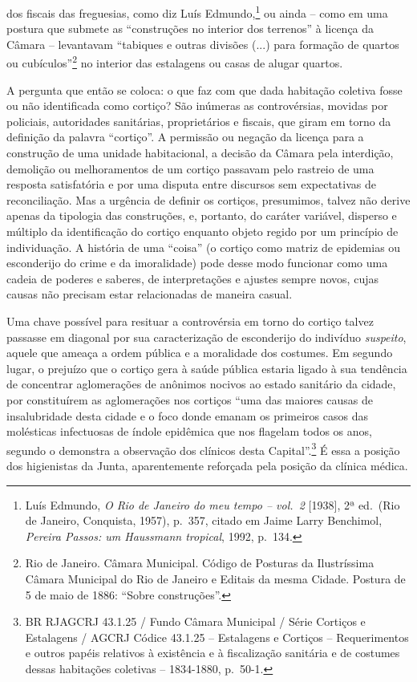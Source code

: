 dos fiscais das freguesias, como diz Luís Edmundo,\footnote{Luís
  Edmundo, \emph{O Rio de Janeiro do meu tempo -- vol.~2} {[}1938{]}, 2ª
  ed.~(Rio de Janeiro, Conquista, 1957), p.~357, citado em Jaime Larry
  Benchimol, \emph{Pereira Passos: um Haussmann tropical}, 1992, p.~134.}
ou ainda -- como em uma postura que submete as ``construções no interior
dos terrenos'' à licença da Câmara -- levantavam ``tabiques e outras
divisões (...) para formação de quartos ou cubículos''\footnote{Rio de
  Janeiro. Câmara Municipal. Código de Posturas da Ilustríssima Câmara
  Municipal do Rio de Janeiro e Editais da mesma Cidade. Postura de 5 de
  maio de 1886: ``Sobre construções''.} no interior das estalagens ou
casas de alugar quartos.

A pergunta que então se coloca: o que faz com que dada habitação
coletiva fosse ou não identificada como cortiço? São inúmeras as
controvérsias, movidas por policiais, autoridades sanitárias,
proprietários e fiscais, que giram em torno da definição da palavra
``cortiço''. A permissão ou negação da licença para a construção de uma
unidade habitacional, a decisão da Câmara pela interdição, demolição ou
melhoramentos de um cortiço passavam pelo rastreio de uma resposta
satisfatória e por uma disputa entre discursos sem expectativas de
reconciliação. Mas a urgência de definir os cortiços, presumimos, talvez
não derive apenas da tipologia das construções, e, portanto, do caráter
variável, disperso e múltiplo da identificação do cortiço enquanto
objeto regido por um princípio de individuação. A história de uma
``coisa'' (o cortiço como matriz de epidemias ou esconderijo do crime e
da imoralidade) pode desse modo funcionar como uma cadeia de poderes e
saberes, de interpretações e ajustes sempre novos, cujas causas não
precisam estar relacionadas de maneira casual.

Uma chave possível para resituar a controvérsia em torno do cortiço
talvez passasse em diagonal por sua caracterização de esconderijo do
indivíduo \emph{suspeito}, aquele que ameaça a ordem pública e a
moralidade dos costumes. Em segundo lugar, o prejuízo que o cortiço gera
à saúde pública estaria ligado à sua tendência de concentrar
aglomerações de anônimos nocivos ao estado sanitário da cidade, por
constituírem as aglomerações nos cortiços ``uma das maiores causas de
insalubridade desta cidade e o foco donde emanam os primeiros casos das
molésticas infectuosas de índole epidêmica que nos flagelam todos os
anos, segundo o demonstra a observação dos clínicos desta
Capital''.\footnote{BR RJAGCRJ 43.1.25 / Fundo Câmara Municipal / Série
  Cortiços e Estalagens / AGCRJ Códice 43.1.25 -- Estalagens e Cortiços
  -- Requerimentos e outros papéis relativos à existência e à
  fiscalização sanitária e de costumes dessas habitações coletivas --
  1834-1880, p.~50-1.} É essa a posição dos higienistas da Junta,
aparentemente reforçada pela posição da clínica médica.

